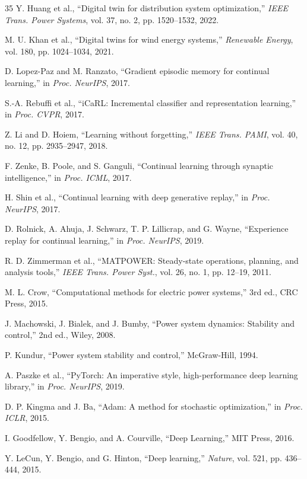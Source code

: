 \documentclass[journal,12pt,onecolumn]{IEEEtran}
\begin{document}
\begin{thebibliography}{35}
Y. Huang et al., ``Digital twin for distribution system optimization,'' \emph{IEEE Trans. Power Systems}, vol. 37, no. 2, pp. 1520--1532, 2022.

M. U. Khan et al., ``Digital twins for wind energy systems,'' \emph{Renewable Energy}, vol. 180, pp. 1024--1034, 2021.

D. Lopez-Paz and M. Ranzato, ``Gradient episodic memory for continual learning,'' in \emph{Proc. NeurIPS}, 2017.

S.-A. Rebuffi et al., ``iCaRL: Incremental classifier and representation learning,'' in \emph{Proc. CVPR}, 2017.

Z. Li and D. Hoiem, ``Learning without forgetting,'' \emph{IEEE Trans. PAMI}, vol. 40, no. 12, pp. 2935--2947, 2018.

F. Zenke, B. Poole, and S. Ganguli, ``Continual learning through synaptic intelligence,'' in \emph{Proc. ICML}, 2017.

H. Shin et al., ``Continual learning with deep generative replay,'' in \emph{Proc. NeurIPS}, 2017.

D. Rolnick, A. Ahuja, J. Schwarz, T. P. Lillicrap, and G. Wayne, ``Experience replay for continual learning,'' in \emph{Proc. NeurIPS}, 2019.

R. D. Zimmerman et al., ``MATPOWER: Steady-state operations, planning, and analysis tools,'' \emph{IEEE Trans. Power Syst.}, vol. 26, no. 1, pp. 12--19, 2011.

M. L. Crow, ``Computational methods for electric power systems,'' 3rd ed., CRC Press, 2015.

J. Machowski, J. Bialek, and J. Bumby, ``Power system dynamics: Stability and control,'' 2nd ed., Wiley, 2008.

P. Kundur, ``Power system stability and control,'' McGraw-Hill, 1994.

A. Paszke et al., ``PyTorch: An imperative style, high-performance deep learning library,'' in \emph{Proc. NeurIPS}, 2019.

D. P. Kingma and J. Ba, ``Adam: A method for stochastic optimization,'' in \emph{Proc. ICLR}, 2015.

I. Goodfellow, Y. Bengio, and A. Courville, ``Deep Learning,'' MIT Press, 2016.

Y. LeCun, Y. Bengio, and G. Hinton, ``Deep learning,'' \emph{Nature}, vol. 521, pp. 436--444, 2015.


\end{thebibliography}
\end{document}
